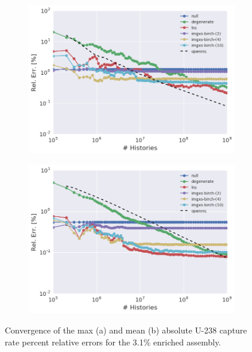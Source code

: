 \begin{figure}[h!]
\centering
\begin{subfigure}{\textwidth}
  \centering
  \includegraphics[width=0.9\linewidth]{figures/results/convergence/assm-31/max-capt-err-evo}
  \caption{}
  \label{fig:chap11-assm-3.1-capture-converge-max}
\end{subfigure}
\begin{subfigure}{\textwidth}
  \centering
  \includegraphics[width=0.9\linewidth]{figures/results/convergence/assm-31/mean-capt-err-evo}
  \caption{}
  \label{fig:chap11-assm-3.1-capture-converge-mean}
\end{subfigure}
\vspace{2mm}
\caption[Fission rate covergence for a 3.1\% enriched assembly]{Convergence of the max (a) and mean (b) absolute U-238 capture rate percent relative errors for the 3.1\% enriched assembly.}
\label{fig:chap11-assm-3.1-capture-converge}
\end{figure}

